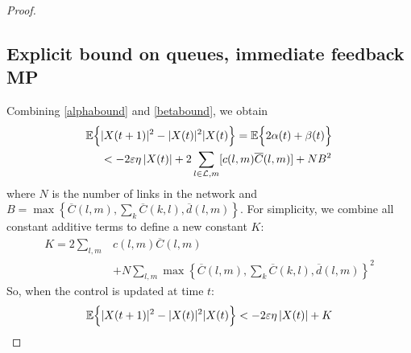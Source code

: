 \begin{proof}
\subsection*{Explicit bound on queues, immediate feedback MP}
{\color{red} Combining \eqref{alphabound} and \eqref{betabound}, we obtain}
\begin{align}
\mathbb{E}\Big\{ &|X(t+1)|^{2} - |X(t)|^{2}  |   X(t) \Big\} = \mathbb{E}\Big\{ 2\alpha(t) + \beta(t) \Big\} \nonumber \\
&<  -2\varepsilon \eta \left| X(t ) \right| + 2 \sum_{l \in \mathcal{L},m} [c(l,m)\overline{C} (l,m) ]+ NB^{2}
\end{align}
where $N$ is the number of links in the network and $B=\max\left\{ \overline{C}(l,m), \sum_{k} \overline{C}(k,l),  \overline d (l,m) \right\}$. 
For simplicity, we combine all constant additive terms to define a new constant $K$:
\begin{align}\label{constCalc}
K = 2 \displaystyle\sum_{l,m} & c(l,m) \overline{C}(l,m) \\
\nonumber & + N \displaystyle\sum_{l,m} \max\left\{ \overline{C}(l,m), \sum_{k} \overline{C}(k,l),  \overline d (l,m) \right\}^2
\end{align}
So, when the control is updated at time $t$:
\begin{equation}\label{stabBasic}
\expectation{|X(t+1)|^{2} - |X(t)|^{2}  |   X(t)} < -2\varepsilon \eta \left| X(t ) \right| + K
\end{equation}










\end{proof}
